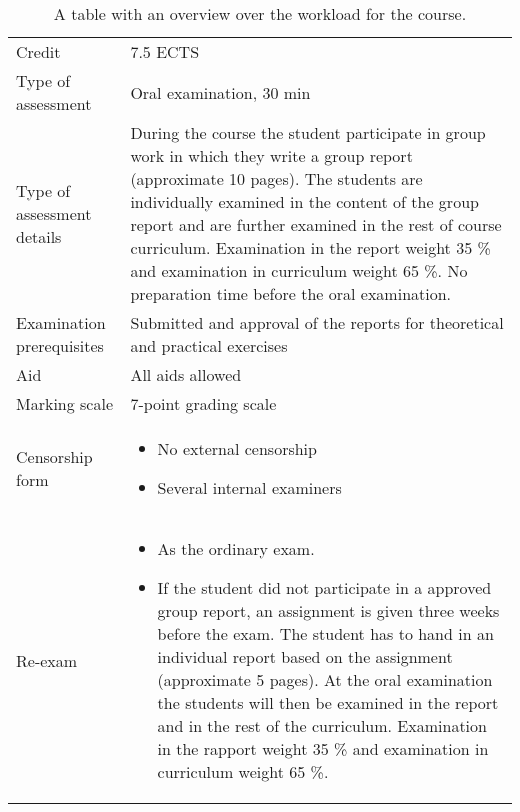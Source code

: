 \begin{table}[h]
    \centering
    \caption{A table with an overview over the workload for the course.}
    \label{tab:workload}
    \begin{tabular}{ l | p{10cm} }
        Credit & 7.5 ECTS \\ 
        
        Type of assessment & Oral examination, 30 min \\ 

        Type of assessment details & During the course the student participate in group work in which they write a group report (approximate 10 pages). The students are individually examined in the content of the group report and are further examined in the rest of course curriculum. Examination in the report weight 35 \% and examination in curriculum weight 65 \%. No preparation time before the oral examination. \\

        Examination prerequisites & Submitted and approval of the reports for theoretical and practical exercises \\ 

        Aid & All aids allowed \\

        Marking scale & 7-point grading scale \\

        Censorship form &   \begin{itemize}
                                \item No external censorship
                                \item Several internal examiners
                            \end{itemize} \\

        Re-exam &   \begin{itemize}
                        \item As the ordinary exam.

                        \item If the student did not participate in a approved group report, an assignment is given three weeks before the exam. The student has to hand in an individual report based on the assignment (approximate 5 pages). At the oral examination the students will then be examined in the report and in the rest of the curriculum. Examination in the rapport weight 35 \% and examination in curriculum weight 65 \%.
                    \end{itemize} \\ 
    \end{tabular}
\end{table}


\newpage